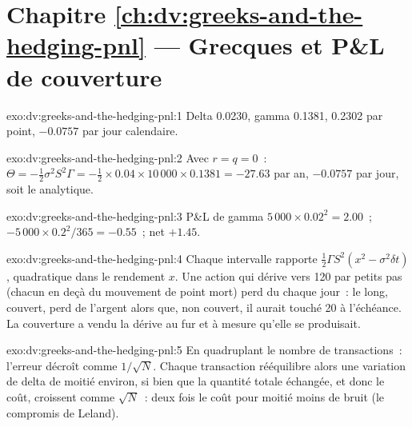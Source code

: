 \section*{Chapitre \ref{ch:dv:greeks-and-the-hedging-pnl} --- Grecques et P\&L de couverture}

\begin{solution}{exo:dv:greeks-and-the-hedging-pnl:1}
Delta 0.0230, gamma 0.1381,  0.2302 par point,  $-0.0757$ par jour calendaire.
\end{solution}

\begin{solution}{exo:dv:greeks-and-the-hedging-pnl:2}
Avec $r=q=0$~: $\Theta=-\tfrac12\sigma^2S^2\Gamma=-\tfrac12\times0.04\times10\,000\times0.1381
=-27.63$ par an, $-0.0757$ par jour, soit le  analytique.
\end{solution}

\begin{solution}{exo:dv:greeks-and-the-hedging-pnl:3}
P\&L de gamma $5\,000\times0.02^2=2.00$~;  $-5\,000\times0.2^2/365=-0.55$~; net $+1.45$.
\end{solution}

\begin{solution}{exo:dv:greeks-and-the-hedging-pnl:4}
Chaque intervalle rapporte $\tfrac12\Gamma S^2(x^2-\sigma^2\delta t)$, quadratique dans le rendement
$x$. Une action qui dérive vers 120 par petits pas (chacun en deçà du mouvement de point mort) perd
du  chaque jour~: le  long, couvert, perd de l'argent alors que, non couvert, il
aurait touché 20 à l'échéance. La couverture a vendu la dérive au fur et à mesure qu'elle se produisait.
\end{solution}

\begin{solution}{exo:dv:greeks-and-the-hedging-pnl:5}
En quadruplant le nombre de transactions~: l'erreur décroît comme $1/\sqrt N$. Chaque transaction rééquilibre alors une variation de delta
de moitié environ, si bien que la quantité totale échangée, et donc le coût, croissent comme $\sqrt N$~:
deux fois le coût pour moitié moins de bruit (le compromis de Leland).
\end{solution}

